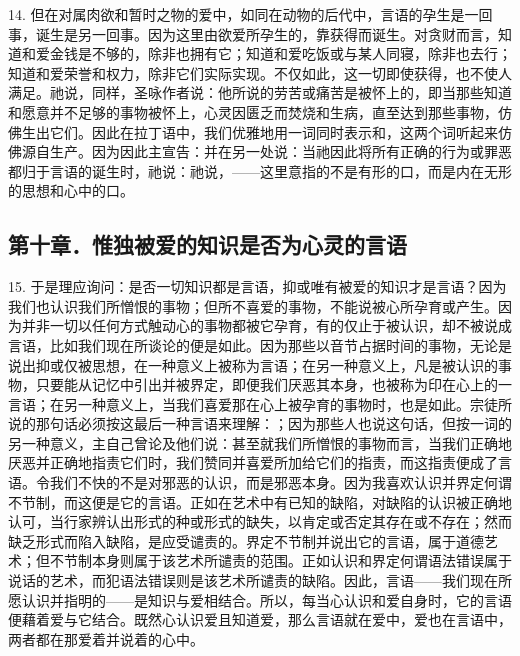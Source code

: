 14. 但在对属肉欲和暂时之物的爱中，如同在动物的后代中，言语的孕生是一回事，诞生是另一回事。因为这里由欲爱所孕生的，靠获得而诞生。对贪财而言，知道和爱金钱是不够的，除非也拥有它；知道和爱吃饭或与某人同寝，除非也去行；知道和爱荣誉和权力，除非它们实际实现。不仅如此，这一切即使获得，也不使人满足。祂说，同样，圣咏作者说：他所说的劳苦或痛苦是被怀上的，即当那些知道和愿意并不足够的事物被怀上，心灵因匮乏而焚烧和生病，直至达到那些事物，仿佛生出它们。因此在拉丁语中，我们优雅地用一词同时表示和，这两个词听起来仿佛源自生产。因为因此主宣告：并在另一处说：当祂因此将所有正确的行为或罪恶都归于言语的诞生时，祂说：祂说，——这里意指的不是有形的口，而是内在无形的思想和心中的口。\par


\subsection{第十章．惟独被爱的知识是否为心灵的言语}

15. 于是理应询问：是否一切知识都是言语，抑或唯有被爱的知识才是言语？因为我们也认识我们所憎恨的事物；但所不喜爱的事物，不能说被心所孕育或产生。因为并非一切以任何方式触动心的事物都被它孕育，有的仅止于被认识，却不被说成言语，比如我们现在所谈论的便是如此。因为那些以音节占据时间的事物，无论是说出抑或仅被思想，在一种意义上被称为言语；在另一种意义上，凡是被认识的事物，只要能从记忆中引出并被界定，即便我们厌恶其本身，也被称为印在心上的一言语；在另一种意义上，当我们喜爱那在心上被孕育的事物时，也是如此。宗徒所说的那句话必须按这最后一种言语来理解：；因为那些人也说这句话，但按一词的另一种意义，主自己曾论及他们说：甚至就我们所憎恨的事物而言，当我们正确地厌恶并正确地指责它们时，我们赞同并喜爱所加给它们的指责，而这指责便成了言语。令我们不快的不是对邪恶的认识，而是邪恶本身。因为我喜欢认识并界定何谓不节制，而这便是它的言语。正如在艺术中有已知的缺陷，对缺陷的认识被正确地认可，当行家辨认出形式的种或形式的缺失，以肯定或否定其存在或不存在；然而缺乏形式而陷入缺陷，是应受谴责的。界定不节制并说出它的言语，属于道德艺术；但不节制本身则属于该艺术所谴责的范围。正如认识和界定何谓语法错误属于说话的艺术，而犯语法错误则是该艺术所谴责的缺陷。因此，言语——我们现在所愿认识并指明的——是知识与爱相结合。所以，每当心认识和爱自身时，它的言语便藉着爱与它结合。既然心认识爱且知道爱，那么言语就在爱中，爱也在言语中，两者都在那爱着并说着的心中。\par

